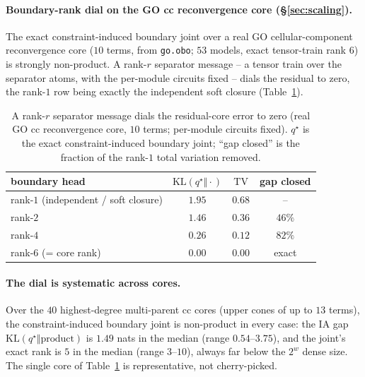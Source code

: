 \documentclass[anon]{nesy2026}
\begin{document}
\paragraph{Boundary-rank dial on the GO cc reconvergence core (\S\ref{sec:scaling}).}
The exact constraint-induced boundary joint over a real GO cellular-component reconvergence core ($10$ terms, from \texttt{go.obo}; $53$ models, exact tensor-train rank $6$) is strongly non-product. A rank-$r$ separator message -- a tensor train over the separator atoms, with the per-module circuits fixed -- dials the residual to zero, the rank-$1$ row being exactly the independent soft closure (Table~\ref{tab:rank}).

\begin{table}[t]\centering
\caption{A rank-$r$ separator message dials the residual-core error to zero (real GO cc reconvergence core, $10$ terms; per-module circuits fixed). $q^\star$ is the exact constraint-induced boundary joint; ``gap closed'' is the fraction of the rank-$1$ total variation removed.}\label{tab:rank}
\small
\begin{tabular}{lccc}
\toprule
boundary head & $\mathrm{KL}(q^\star\Vert\cdot)$ & $\mathrm{TV}$ & gap closed\\
\midrule
rank-$1$ (independent / soft closure) & $1.95$ & $0.68$ & -- \\
rank-$2$ & $1.46$ & $0.36$ & $46\%$\\
rank-$4$ & $0.26$ & $0.12$ & $82\%$\\
rank-$6$ (= core rank) & $0.00$ & $0.00$ & exact\\
\bottomrule
\end{tabular}
\end{table}

\paragraph{The dial is systematic across cores.}
Over the $40$ highest-degree multi-parent cc cores (upper cones of up to $13$ terms), the
constraint-induced boundary joint is non-product in every case: the IA gap
$\mathrm{KL}(q^\star\Vert\text{product})$ is $1.49$ nats in the median (range $0.54$--$3.75$),
and the joint's exact rank is $5$ in the median (range $3$--$10$), always far below the $2^{w}$
dense size. The single core of Table~\ref{tab:rank} is representative, not cherry-picked.
\end{document}
